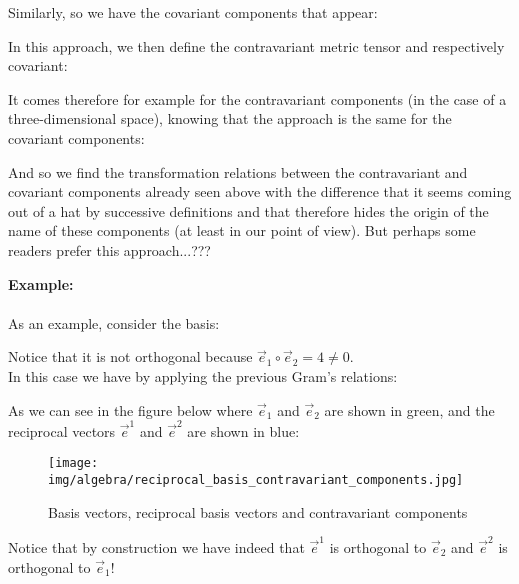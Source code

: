 	Similarly, so we have the covariant components that appear:
	
	In this approach, we then define the contravariant  metric tensor and respectively covariant:
	
	It comes therefore for example for the contravariant components (in the case of a three-dimensional space), knowing that the approach is the same for the covariant components:
	
	And so we find the transformation relations between the  contravariant and covariant components already seen above with the difference that it seems coming out of a hat by successive definitions and that therefore hides the origin of the name of these components (at least in our point of view). But perhaps some readers prefer this approach...???
	
	\begin{tcolorbox}[colframe=black,colback=white,sharp corners]
	\textbf{{\Large {}}Example:}\\\\
	As an example, consider the basis:
	
	Notice that it is not orthogonal because $\vec{e}_1\circ \vec{e}_2=4\neq 0$.\\

	In this case we have by applying the previous Gram's relations:
	
	As we can see in the figure below where $\vec{e}_1$ and $\vec{e}_2$ are shown in green, and the reciprocal vectors  $\vec{e}^1$ and  $\vec{e}^2$ are shown in blue:\\
	\begin{figure}[H]
		\centering
		\texttt{[image: img/algebra/reciprocal\_basis\_contravariant\_components.jpg]}
		\caption[]{Basis vectors, reciprocal basis vectors and contravariant components}
	\end{figure}
	Notice that by construction we have indeed that $\vec{e}^1$ is orthogonal to $\vec{e}_2$ and $\vec{e}^2$ is orthogonal to $\vec{e}_1$!
	\end{tcolorbox}
	
